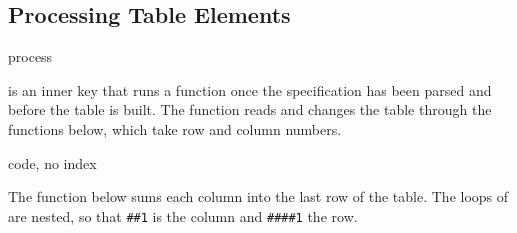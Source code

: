 \subsection{Processing Table Elements}
\begin{codedescribe}[
        key,
        new=2022B
    ]{process}
    \begin{codesyntax}
    \end{codesyntax}
     is an inner key that runs a function once the specification has been parsed and before the table is built. The function reads and changes the table through the functions below, which take row and column numbers.
    \begin{describelist*}{code, no index}
    \end{describelist*}
\end{codedescribe}

The function below sums each column into the last row of the table. The loops of \tsobj[code]{\intStepOneInline} are nested, so that \texttt{\#\#1} is the column and \texttt{\#\#\#\#1} the row.

\begin{center}
\end{center}

